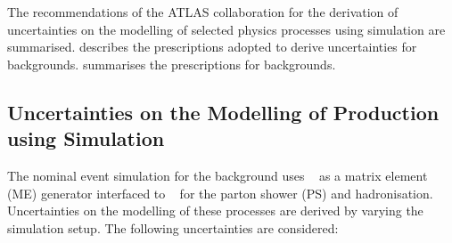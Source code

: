 The recommendations of the ATLAS collaboration for the derivation of
uncertainties on the modelling of selected physics processes using simulation
are summarised.  describes the prescriptions adopted
to derive uncertainties for \ttbar backgrounds. 
summarises the prescriptions for \Zjets backgrounds.


\subsection{Uncertainties on the Modelling of \ttbar Production using
  Simulation}%
\label{app:top_uncertainties}

The nominal event simulation for the \ttbar background uses
\POWHEGBOX[v2]~\cite{Frixione:2007nw} as a matrix element (ME) generator
interfaced to \PYTHIA[8.230]~\cite{Sjostrand:2014zea} for the parton shower (PS)
and hadronisation. Uncertainties on the modelling of these processes are derived
by varying the simulation setup. The following uncertainties are considered:
